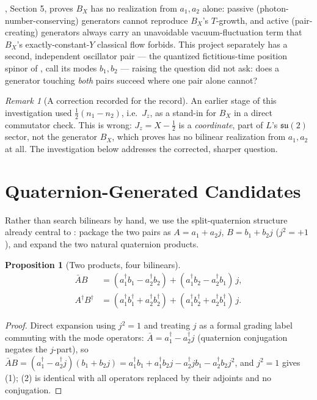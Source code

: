 \documentclass[12pt]{amsart}
\theoremstyle{plain}
\newtheorem{proposition}[theorem]{Proposition}
\theoremstyle{remark}
\newtheorem*{remark}{Remark}
\begin{document}
\cite{Ebert2026Quantum}, Section 5, proves $B_X$ has no realization from $a_1,a_2$ alone: passive (photon-number-conserving) generators cannot reproduce $B_X$'s $T$-growth, and active (pair-creating) generators always carry an unavoidable vacuum-fluctuation term that $B_X$'s exactly-constant-$Y$ classical flow forbids. This project separately has a second, independent oscillator pair --- the quantized fictitious-time position spinor of \cite{Ebert2026LeviCivita}, call its modes $b_1,b_2$ --- raising the question \cite{Ebert2026Quantum} did not ask: does a generator touching \emph{both} pairs succeed where one pair alone cannot?

\begin{remark}[A correction recorded for the record]
An earlier stage of this investigation used $\tfrac12(n_1-n_2)$, i.e.\ $J_z$, as a stand-in for $B_X$ in a direct commutator check. This is wrong: $J_z=X-\tfrac12$ is a \emph{coordinate}, part of $L$'s $\mathfrak{su}(2)$ sector, not the generator $B_X$, which \cite{Ebert2026Quantum} proves has no bilinear realization from $a_1,a_2$ at all. The investigation below addresses the corrected, sharper question.
\end{remark}

\section{Quaternion-Generated Candidates}

Rather than search bilinears by hand, we use the split-quaternion structure already central to \cite{Ebert2026Clock}: package the two pairs as $A=a_1+a_2j$, $B=b_1+b_2j$ ($j^2=+1$), and expand the two natural quaternion products.

\begin{proposition}[Two products, four bilinears]\label{prop:quatproducts}
\begin{align}
\bar AB &= (a_1^\dagger b_1-a_2^\dagger b_2) + (a_1^\dagger b_2-a_2^\dagger b_1)\,j, \tag{1}\\
A^\dagger B^\dagger &= (a_1^\dagger b_1^\dagger+a_2^\dagger b_2^\dagger) + (a_1^\dagger b_2^\dagger+a_2^\dagger b_1^\dagger)\,j. \tag{2}
\end{align}
\end{proposition}

\begin{proof}
Direct expansion using $j^2=1$ and treating $j$ as a formal grading label commuting with the mode operators: $\bar A=a_1^\dagger-a_2^\dagger j$ (quaternion conjugation negates the $j$-part), so $\bar AB=(a_1^\dagger-a_2^\dagger j)(b_1+b_2j)=a_1^\dagger b_1+a_1^\dagger b_2j-a_2^\dagger jb_1-a_2^\dagger b_2j^2$, and $j^2=1$ gives (1); (2) is identical with all operators replaced by their adjoints and no conjugation.
\end{proof}
\end{document}
